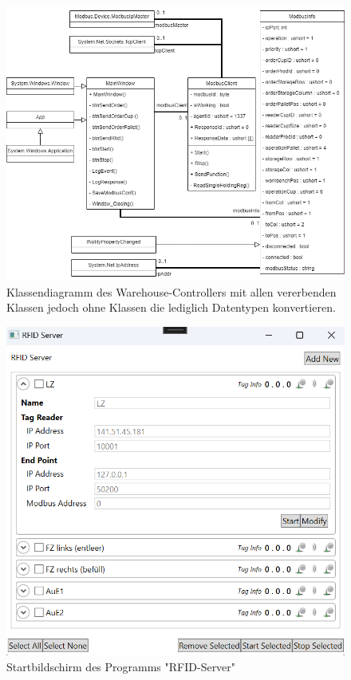     \begin{figure}[h]
        \label{fig:figure6}
        \includegraphics[width = \textwidth ]{Bilder/C_Klassendiagramm}
        \caption[Klassendiagramm des Controllers ]%
        {\small Klassendiagramm des Warehouse-Controllers mit allen vererbenden Klassen jedoch ohne Klassen die
        lediglich Datentypen konvertieren.}
        \centering
    \end{figure}

    \begin{figure}[h]
        \label{fig:figure7}
        \includegraphics[width = \textwidth ]{Bilder/RFIDServer_Bildschirm}
        \caption[Startbildschirm des Programms "RFID-Server" ]%
        {\small Startbildschirm des Programms "RFID-Server"}
        \centering
    \end{figure}

